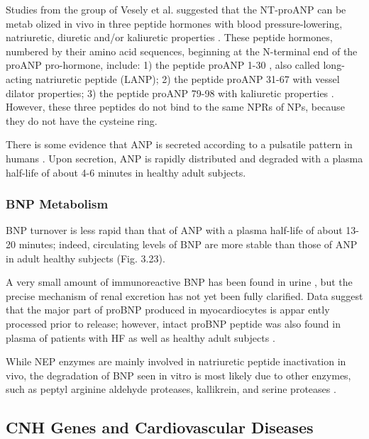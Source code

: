 \documentclass[14pt,a4paper,onecolumn]{extarticle}
\begin{document}
Studies from the group of Vesely et al. suggested that the NT-proANP can be metab olized in vivo in three peptide hormones with blood pressure-lowering, natriuretic, diuretic and/or kaliuretic properties \citep{100}. These peptide hormones, numbered by their amino acid sequences, beginning at the N-terminal end of the proANP pro-hormone, include: 1) the peptide proANP 1-30 , also called long-acting natriuretic peptide (LANP); 2) the peptide proANP 31-67 with vessel dilator properties; 3) the peptide proANP 79-98 with kaliuretic properties \citep{98}. However, these three peptides do not bind to the same NPRs of NPs, because they do not have the cysteine ring.



There is some evidence that ANP is secreted according to a pulsatile pattern in humans \citep{197}. Upon secretion, ANP is rapidly distributed and degraded  with a plasma half-life of about 4-6 minutes in healthy adult subjects.



\subsubsection{BNP Metabolism}



BNP turnover is less rapid than that of ANP with a plasma half-life of about 13-20 minutes; indeed, circulating levels of BNP are more stable than those of ANP in adult healthy subjects (Fig. 3.23).



A very small amount of immunoreactive BNP has been found in urine \citep{203}, but the precise mechanism of renal excretion has not yet been fully clarified.  Data suggest that the major part of proBNP produced in myocardiocytes is appar ently processed prior to release; however, intact proBNP peptide was also found in plasma of patients with HF as well as healthy adult subjects \citep{14}.



While NEP enzymes are mainly involved in natriuretic peptide inactivation in vivo, the degradation of BNP seen in vitro is most likely due to other enzymes, such as peptyl arginine aldehyde proteases, kallikrein, and serine proteases \citep{15}.



\subsection{CNH Genes and Cardiovascular Diseases}
\end{document}
